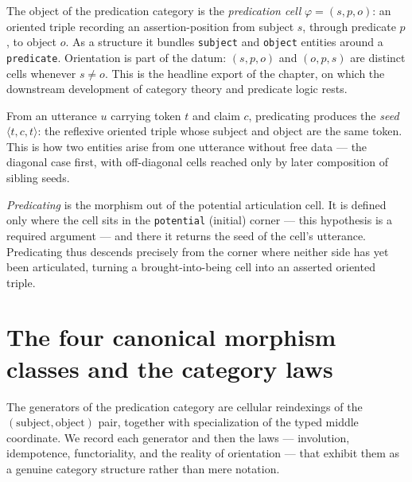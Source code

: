 \begin{definition}\label{def:predication}\leanok{}
The object of the predication category is the \emph{predication cell} $\varphi = (s, p, o)$: an oriented triple recording an assertion-position from subject $s$, through predicate $p$, to object $o$. As a structure it bundles \texttt{subject} and \texttt{object} entities around a \texttt{predicate}. Orientation is part of the datum: $(s,p,o)$ and $(o,p,s)$ are distinct cells whenever $s \neq o$. This is the headline export of the chapter, on which the downstream development of category theory and predicate logic rests.
\end{definition}

\begin{definition}\label{def:predication-seed}\leanok{}
From an utterance $u$ carrying token $t$ and claim $c$, predicating produces the \emph{seed} $\langle t, c, t\rangle$: the reflexive oriented triple whose subject and object are the same token. This is how two entities arise from one utterance without free data --- the diagonal case first, with off-diagonal cells reached only by later composition of sibling seeds.
\end{definition}

\begin{definition}\leanok{}
\emph{Predicating} is the morphism out of the potential articulation cell. It is defined only where the cell sits in the \texttt{potential} (initial) corner --- this hypothesis is a required argument --- and there it returns the seed of the cell's utterance. Predicating thus descends precisely from the corner where neither side has yet been articulated, turning a brought-into-being cell into an asserted oriented triple.
\end{definition}

\section{The four canonical morphism classes and the category laws}

The generators of the predication category are cellular reindexings of the $(\text{subject},\text{object})$ pair, together with specialization of the typed middle coordinate. We record each generator and then the laws --- involution, idempotence, functoriality, and the reality of orientation --- that exhibit them as a genuine category structure rather than mere notation.


